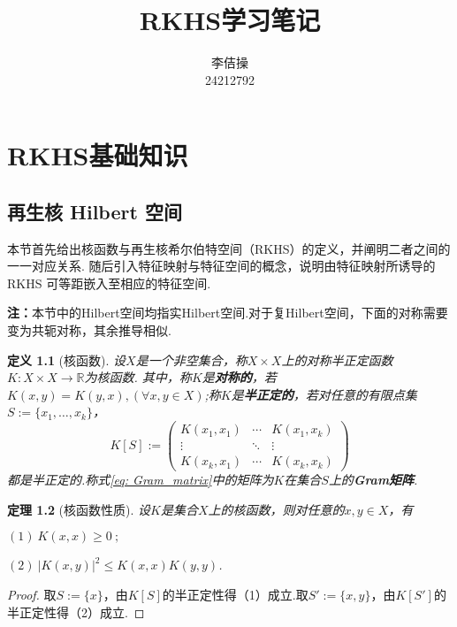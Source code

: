 \documentclass[12pt, a4paper, oneside]{ctexbook}
\title{{\Huge{\textbf{RKHS学习笔记}}}}
\author{李佶操 \\24212792}
\newtheorem{theorem}{定理}[section]
\newtheorem{definition}[theorem]{定义}
\begin{document}
\maketitle

\setcounter{page}{1}

\setcounter{page}{1}
\tableofcontents
\newpage
\setcounter{page}{1}

\chapter{RKHS基础知识}
\section{再生核 Hilbert 空间}
本节首先给出核函数与再生核希尔伯特空间（RKHS）的定义，并阐明二者之间的一一对应关系. 随后引入特征映射与特征空间的概念，说明由特征映射所诱导的 RKHS 可等距嵌入至相应的特征空间.

\textbf{注：}本节中的Hilbert空间均指实Hilbert空间.对于复Hilbert空间，下面的对称需要变为共轭对称，其余推导相似.

\begin{definition}[核函数]
    设$X$是一个非空集合，称$X\times X$上的对称半正定函数$K:X\times X\to\mathbb{R}$为核函数.
    其中，称$K$是\textbf{对称的}，若$K(x,y)=K(y,x),(\forall x,y\in X)$;称$K$是\textbf{半正定的}，若对任意的有限点集$S:=\{x_1,\dots,x_k\}$，
    \begin{equation}\label{eq: Gram_matrix}
        K[S]:=\begin{pmatrix}
            K(x_1,x_1)&\cdots&K(x_1,x_k)\\
            \vdots&\ddots&\vdots\\
            K(x_k,x_1)&\cdots&K(x_k,x_k)
        \end{pmatrix}
    \end{equation}
    都是半正定的.称式\eqref{eq: Gram_matrix}中的矩阵为$K$在集合$S$上的\textbf{Gram矩阵}.
\end{definition}

\begin{theorem}[核函数性质]\label{thm:对称半正定K(xx)>0}
    设$K$是集合$X$上的核函数，则对任意的$x,y\in X$，有

    $(1)~K(x,x)\geq 0~;$
    
    $(2)~\left|K(x,y)\right|^2\leq K(x,x)K(y,y)$.
\end{theorem}

\begin{proof}
    取$S:=\{x\}$，由$K[S]$的半正定性得（1）成立.取$S':=\{x,y\}$，由$K[S']$的半正定性得（2）成立.
\end{proof}
\end{document}
